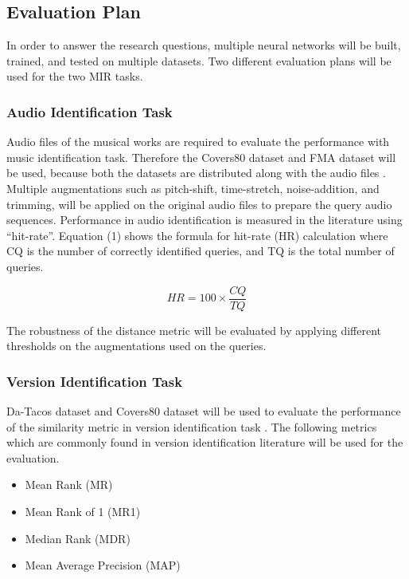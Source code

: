 \documentclass[../main.tex]{subfiles}
\begin{document}
\subsection{Evaluation Plan}
In order to answer the research questions, multiple neural networks will be built, trained, and tested on multiple datasets. Two different evaluation plans will be used for the two \gls{MIR} tasks.

\subsubsection{Audio Identification Task}
Audio files of the musical works are required to evaluate the performance with music identification task. Therefore the Covers80 dataset and FMA dataset will be used, because both the datasets are distributed along with the audio files \cite{Covers80CoverSong,defferrardFMADatasetMusic2017}. Multiple augmentations such as pitch-shift, time-stretch, noise-addition, and trimming, will be applied on the original audio files to prepare the query audio sequences. Performance in audio identification is measured in the literature using “hit-rate”. Equation (1) shows the formula for hit-rate (HR) calculation where CQ is the number of correctly identified queries, and TQ is the total number of queries.

\begin{equation}
    HR = 100 \times \frac{CQ}{TQ}
\end{equation}

\par
The robustness of the distance metric will be evaluated by applying different thresholds on the augmentations used on the queries.

\newpage
\subsubsection{Version Identification Task}
Da-Tacos dataset and Covers80 dataset will be used to evaluate the performance of the similarity metric in version identification task \cite{yesilerDaTACOSDatasetCover2019,Covers80CoverSong}. The following metrics which are commonly found in version identification literature will be used for the evaluation.
\begin{itemize}
    \item Mean Rank (MR)
    \item Mean Rank of 1 (MR1)
    \item Median Rank (MDR)
    \item Mean Average Precision (MAP)
\end{itemize}
\end{document}
